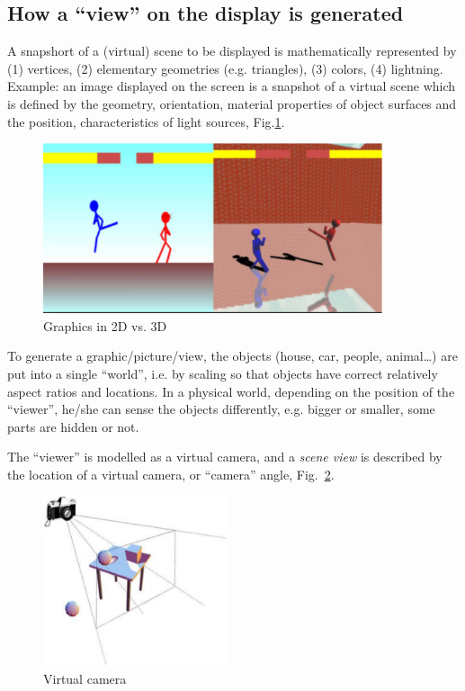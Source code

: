 \subsection{How a ``view'' on the display is generated}
\label{sec:superf-viewp}

A snapshort of a (virtual) scene to be displayed is mathematically represented
by (1) vertices, (2) elementary geometries (e.g. triangles), (3) colors, (4)
lightning. Example: an image displayed on the screen is a snapshot of a virtual
scene which is defined by the geometry, orientation, material properties of
object surfaces and the position, characteristics of light sources,
Fig.\ref{fig:graphics_2D_3D}.


\begin{figure}[hbt]
 \centerline{\includegraphics[height=5cm, angle=0]{./images/graphics_2D_3D.eps}}
 \caption{Graphics in 2D vs. 3D}
 \label{fig:graphics_2D_3D}
\end{figure}


To generate a graphic/picture/view, the objects (house, car, people,
animal\ldots) are put into a single ``world'', i.e. by scaling so that objects
have correct relatively aspect ratios and locations. In a physical world,
depending on the position of the ``viewer'', he/she can sense the objects
differently, e.g.  bigger or smaller, some parts are hidden or not.

\begin{framed}
  The ``viewer'' is modelled as a virtual camera, and a
  {\it scene view} is described by the location of a virtual camera, or
  ``camera'' angle, Fig.~\ref{fig:graph_virtual_camera}.
\end{framed}

\begin{figure}[hbt]
 \centerline{\includegraphics[height=5cm, angle=0]{./images/graphics_virtual_camera.eps}}
 \caption{Virtual camera}
 \label{fig:graph_virtual_camera}
\end{figure}


